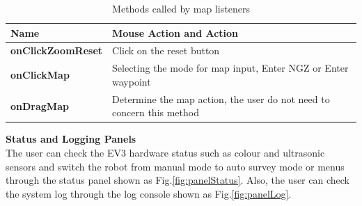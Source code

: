 \begin{table}[H]
	\centering
	\caption{Methods called by map listeners}
	\label{Methods called by map listeners}
	\begin{tabular}{|l|l|}
		\hline
		\textbf{Name}             & Mouse Action and Action                                                                                                                                                                                                                             \\ \hline
		\textbf{onClickZoomReset} & Click on the reset button                                                                                                                                                                                                                           \\ \hline
		\textbf{onClickMap}       & Selecting the mode for map input, Enter NGZ or Enter waypoint \\ \hline
		\textbf{onDragMap}        & Determine the map action, the user do not need to concern this method                                                                                                                                                                               \\ \hline
	\end{tabular}
\end{table}

\textbf{Status and Logging Panels}\\
The user can check the EV3 hardware status such as colour and ultrasonic sensors and switch the robot from manual mode to auto survey mode or menus through the status panel shown as Fig.\ref{fig:panelStatus}. Also, the user can check the system log through the log console shown as Fig.\ref{fig:panelLog}.

